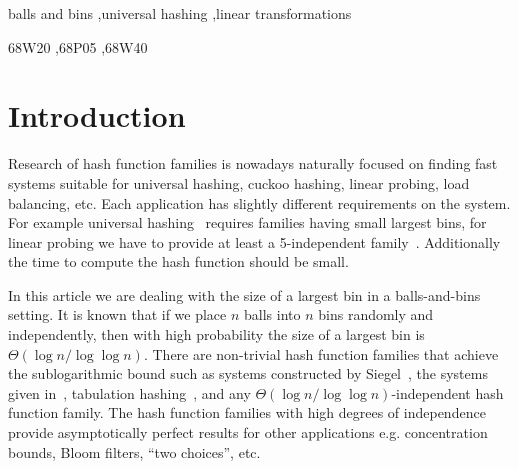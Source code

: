 ﻿\documentclass[review]{elsarticle}
\title{\TheTitle}
\author[mff]{\TheAuthors\corref{corresponding}}
\newcommand{\vecspace}[2]{\mathbb{Z}_{#1}^{#2}}
\newcommand{\binvecspace}[1]{\vecspace{2}{#1}}
\begin{document}
\begin{abstract}
We study the placement of $n$ balls into $n$ bins where balls and bins are represented as two vector spaces over $\binvecspace{}$. The placement is done according to a linear transformation between the two vector spaces.
We analyze the expected size of a largest bin. The only currently known upper bound is $O(\log n \log \log n)$ by Alon et al. and holds for placing $n \log n$ balls into $n$ bins.
We show that this bound can be improved to $O(\log n)$ in the case when $n$ balls are placed into $n$ bins.
We use the same basic technique as Alon et al. but give a tighter analysis for this case.
\end{abstract}

\begin{keyword}
balls and bins \sep universal hashing \sep linear transformations

\MSC 68W20 \sep 68P05 \sep 68W40
\end{keyword}

\maketitle

\section{Introduction}

Research of hash function families is nowadays naturally focused on finding fast systems suitable for universal hashing, cuckoo hashing, linear probing, load balancing, etc.
Each application has slightly different requirements on the system.
For example universal hashing~\cite{cw} requires families having small largest bins, for linear probing we have to provide at least a 5-independent family~\cite{linear-probing}.
Additionally the time to compute the hash function should be small.

In this article we are dealing with the size of a largest bin in a balls-and-bins setting.
It is known that if we place $n$ balls into $n$ bins randomly and independently, then with high probability the size of a largest bin is $\Theta(\log n/\log \log n)$.
There are non-trivial hash function families that achieve the sublogarithmic bound such as systems constructed by Siegel~\cite{siegel}, the systems given in~\cite{celisetal}, tabulation hashing~\cite{charhash}, and any $\Theta(\log n/\log \log n)$-independent hash function family. 
The hash function families with high degrees of independence provide asymptotically perfect results for other applications e.g. concentration bounds, Bloom filters, ``two choices'', etc.
\end{document}
